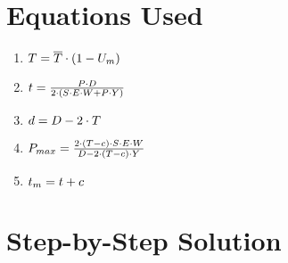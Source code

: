 \documentclass[11pt,a4paper]{article}
\begin{document}
\section{Equations Used}

\begin{enumerate}
\item $\Large T = \overline{T}  \cdot  (1  - U_m)$
\item $\Large t = \frac{P  \cdot  D}{2   \cdot  (S  \cdot  E  \cdot  W + P  \cdot  Y)}$
\item $\Large d = D - 2   \cdot  T$
\item $\Large P_{max} = \frac{2   \cdot  (T - c)  \cdot  S  \cdot  E  \cdot  W}{D - 2   \cdot  (T - c)  \cdot  Y}$
\item $\Large t_{m} = t + c$
\end{enumerate}

\section{Step-by-Step Solution}
\end{document}
